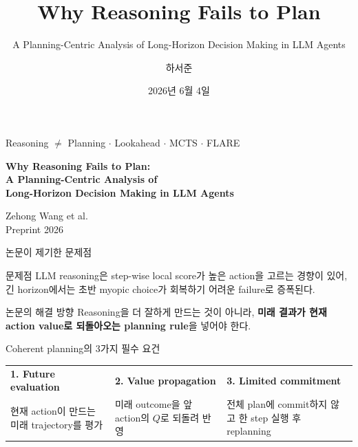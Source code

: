\documentclass[
11pt,notheorems,hyperref={pdfauthor=whatever}
]{beamer}
\title[]{Why Reasoning Fails to Plan}
\subtitle{A Planning-Centric Analysis of Long-Horizon Decision Making in LLM Agents}
\author[]{하서준}
\institute{DGIST}
\date{2026년 6월 4일}
\begin{document}
{
\begin{frame}
  \titlepage
  \vspace{-0.8em}
  \begin{center}
  \scriptsize
  Reasoning \(\neq\) Planning \(\cdot\) Lookahead \(\cdot\) MCTS \(\cdot\) FLARE
  \end{center}
\end{frame}
}
\addtocounter{framenumber}{-1}

\begin{frame}[plain]
\centering
\vspace{0.22\textheight}
{\Large\bfseries Why Reasoning Fails to Plan:\\A Planning-Centric Analysis of\\Long-Horizon Decision Making in LLM Agents}
\vspace{1.2em}

{\small Zehong Wang et al.}\\
{\scriptsize Preprint 2026}
\end{frame}

\begin{frame}{논문이 제기한 문제점}
\vspace{0.15em}
\begin{alertblock}{문제점}
\small
LLM reasoning은 step-wise local score가 높은 action을 고르는 경향이 있어, 긴 horizon에서는 초반 myopic choice가 회복하기 어려운 failure로 증폭된다.
\end{alertblock}

\vspace{0.15em}
\begin{block}{논문의 해결 방향}
\small
Reasoning을 더 잘하게 만드는 것이 아니라, \textbf{미래 결과가 현재 action value로 되돌아오는 planning rule}을 넣어야 한다.
\end{block}

\vspace{0.25em}
\begin{center}
\end{center}

\vspace{-0.1em}
\begin{block}{Coherent planning의 3가지 필수 요건}
\scriptsize
\begin{tabular}{@{}p{}p{}p{}@{}}
\textbf{1. Future evaluation} &
\textbf{2. Value propagation} &
\textbf{3. Limited commitment} \\
현재 action이 만드는 미래 trajectory를 평가 &
미래 outcome을 앞 action의 \(Q\)로 되돌려 반영 &
전체 plan에 commit하지 않고 한 step 실행 후 replanning \\
\end{tabular}
\end{block}
\end{frame}
\end{document}
